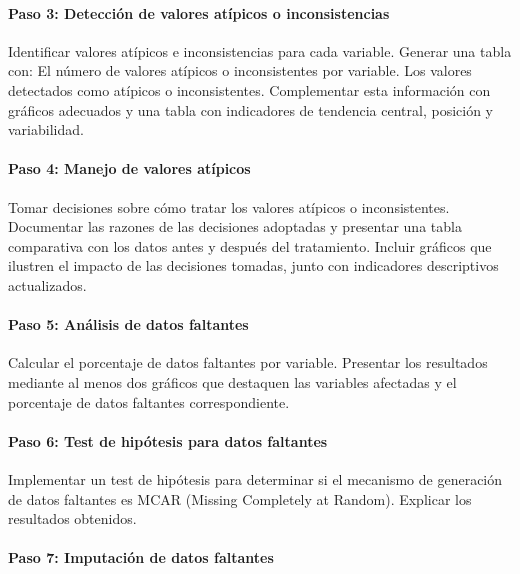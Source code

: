 \documentclass[
]{article}
\begin{document}
\paragraph{Paso 3: Detección de valores atípicos o
inconsistencias}\label{paso-3-detecciuxf3n-de-valores-atuxedpicos-o-inconsistencias}

Identificar valores atípicos e inconsistencias para cada variable.
Generar una tabla con: El número de valores atípicos o inconsistentes
por variable. Los valores detectados como atípicos o inconsistentes.
Complementar esta información con gráficos adecuados y una tabla con
indicadores de tendencia central, posición y variabilidad.

\paragraph{Paso 4: Manejo de valores
atípicos}\label{paso-4-manejo-de-valores-atuxedpicos}

Tomar decisiones sobre cómo tratar los valores atípicos o
inconsistentes. Documentar las razones de las decisiones adoptadas y
presentar una tabla comparativa con los datos antes y después del
tratamiento. Incluir gráficos que ilustren el impacto de las decisiones
tomadas, junto con indicadores descriptivos actualizados.

\paragraph{Paso 5: Análisis de datos
faltantes}\label{paso-5-anuxe1lisis-de-datos-faltantes}

Calcular el porcentaje de datos faltantes por variable. Presentar los
resultados mediante al menos dos gráficos que destaquen las variables
afectadas y el porcentaje de datos faltantes correspondiente.

\paragraph{Paso 6: Test de hipótesis para datos
faltantes}\label{paso-6-test-de-hipuxf3tesis-para-datos-faltantes}

Implementar un test de hipótesis para determinar si el mecanismo de
generación de datos faltantes es MCAR (Missing Completely at Random).
Explicar los resultados obtenidos.

\paragraph{Paso 7: Imputación de datos
faltantes}\label{paso-7-imputaciuxf3n-de-datos-faltantes}
\end{document}
